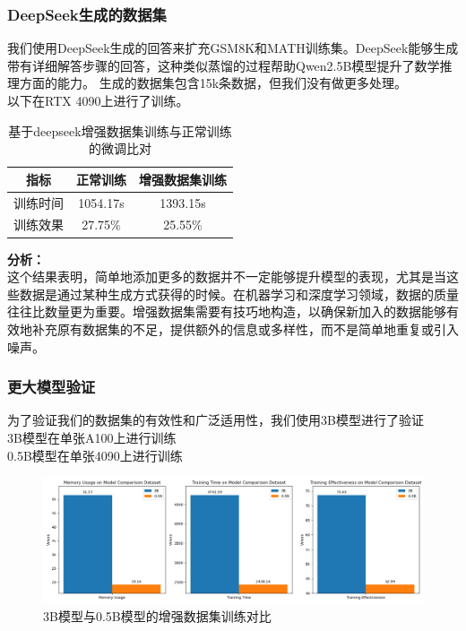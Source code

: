 \documentclass{article}
\begin{document}
\subsubsection{DeepSeek生成的数据集}
我们使用DeepSeek生成的回答来扩充GSM8K和MATH训练集。DeepSeek能够生成带有详细解答步骤的回答，这种类似蒸馏的过程帮助Qwen2.5B模型提升了数学推理方面的能力。
生成的数据集包含15k条数据，但我们没有做更多处理。
\\以下在RTX 4090上进行了训练。
\begin{table}[H]
  \caption{基于deepseek增强数据集训练与正常训练的微调比对}
  \label{deepseek-augmentation-comparison-table}
  \centering
  \begin{tabular}{|c|c|c|}
    \hline
    \textbf{指标} & \textbf{正常训练} & \textbf{增强数据集训练} \\ \hline
    训练时间 & 1054.17s & 1393.15s \\ \hline
    训练效果 & 27.75\% & 25.55\% \\ \hline
  \end{tabular}
\end{table}

\textbf{分析：}\\
这个结果表明，简单地添加更多的数据并不一定能够提升模型的表现，尤其是当这些数据是通过某种生成方式获得的时候。在机器学习和深度学习领域，数据的质量往往比数量更为重要。增强数据集需要有技巧地构造，以确保新加入的数据能够有效地补充原有数据集的不足，提供额外的信息或多样性，而不是简单地重复或引入噪声。


\subsubsection{更大模型验证}
为了验证我们的数据集的有效性和广泛适用性，我们使用3B模型进行了验证
\\ 3B模型在单张A100上进行训练
\\ 0.5B模型在单张4090上进行训练
\begin{figure}[H]
  \centering
  \includegraphics[width=1\textwidth]{scaling_graph.png} %
  \caption{3B模型与0.5B模型的增强数据集训练对比} %
  \label{fig:my_label2} %
\end{figure}
\end{document}
